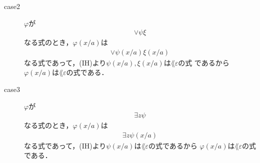 \begin{metaprf}
\begin{description}
\begin{description}
					\item[case2] $\varphi$が
						\begin{align}
							\vee \psi \xi
						\end{align}
						なる式のとき，$\varphi(x/a)$は
						\begin{align}
							\vee \psi(x/a) \xi(x/a)
						\end{align}
						なる式であって，(IH)より$\psi(x/a),\xi(x/a)$は$\lang{\varepsilon}$の式
						であるから$\varphi(x/a)$は$\lang{\varepsilon}$の式である．
					
					\item[case3] $\varphi$が
						\begin{align}
							\exists z \psi
						\end{align}
						なる式のとき，$\varphi(x/a)$は
						\begin{align}
							\exists z \psi(x/a)
						\end{align}
						なる式であって，(IH)より$\psi(x/a)$は$\lang{\varepsilon}$の式であるから
						$\varphi(x/a)$は$\lang{\varepsilon}$の式である．
						\QED
				\end{description}
		\end{description}
	\end{metaprf}